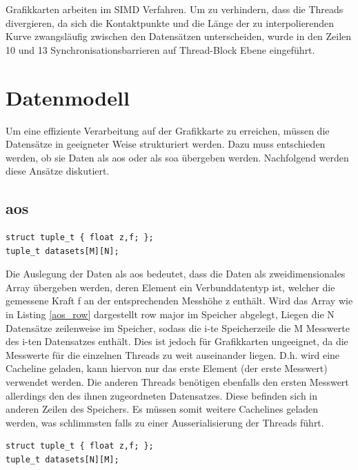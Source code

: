 Grafikkarten arbeiten im SIMD Verfahren. Um zu verhindern, dass die Threads divergieren, da sich die Kontaktpunkte und die Länge der zu interpolierenden Kurve zwangsläufig zwischen den Datensätzen unterscheiden, wurde in den Zeilen 10 und 13 Synchronisationsbarrieren auf Thread-Block Ebene eingeführt.

\section{Datenmodell}
Um eine effiziente Verarbeitung auf der Grafikkarte zu erreichen, müssen die Datensätze in geeigneter Weise strukturiert werden.
Dazu muss entschieden werden, ob sie Daten als \gls{aos} oder als \gls{soa} übergeben werden. Nachfolgend werden diese Ansätze diskutiert.

\subsection{\acrlong{aos}}
\begin{lstlisting}[label=aos_row,caption=\gls{aos} row major]
struct tuple_t { float z,f; };
tuple_t datasets[M][N];
\end{lstlisting}


Die Auslegung der Daten als \gls{aos} bedeutet, dass die Daten als zweidimensionales Array übergeben werden, deren Element ein Verbunddatentyp ist, welcher die gemessene Kraft f an der entsprechenden Messhöhe z enthält. Wird das Array wie in Listing \ref{aos_row} dargestellt row major im Speicher abgelegt, Liegen die N Datensätze zeilenweise im Speicher, sodass die i-te Speicherzeile die M Messwerte des i-ten Datensatzes enthält.
Dies ist jedoch für Grafikkarten ungeeignet, da die Messwerte für die einzelnen Threads zu weit auseinander liegen. D.h. wird eine Cacheline geladen, kann hiervon nur das erste Element (der erste Messwert) verwendet werden. Die anderen Threads benötigen ebenfalls den ersten Messwert allerdings den des ihnen zugeordneten Datensatzes. Diese befinden sich in anderen Zeilen des Speichers.
Es müssen somit weitere Cachelines geladen werden, was schlimmsten falls zu einer Ausserialisierung der Threads führt.


\begin{lstlisting}[label=aos_col,caption=\gls{aos} column major]
struct tuple_t { float z,f; };
tuple_t datasets[N][M];
\end{lstlisting}

